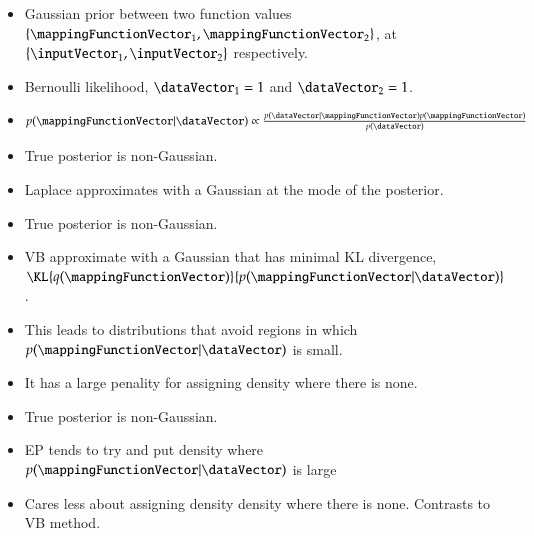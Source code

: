 \documentclass[serif, mathserif, professionalfont]{beamer} %
\newcommand{\fV}{\mappingFunctionVector}
\newcommand{\yV}{\dataVector}
\newcommand{\xV}{\inputVector}
\begin{document}
{\begin{overprint}
{        }
    \end{overprint}
    \begin{overprint}
         \begin{itemize}
            \item Gaussian prior between two function values $\{\fV_{1}, \fV_{2}\}$, at $\{\xV_{1}, \xV_{2}\}$ respectively. 
            \item Bernoulli likelihood, $\yV_{1} = 1$ and $\yV_{2} = 1$.\end{itemize}
         \begin{itemize}
            \item $p(\fV|\yV) \propto \frac{p(\yV|\fV)p(\fV)}{p(\yV)}$
            \item True posterior is non-Gaussian.
            \item Laplace approximates with a Gaussian at the mode of the posterior.
        \end{itemize}
         \begin{itemize}
            \item True posterior is non-Gaussian. 
            \item VB approximate with a Gaussian that has minimal KL divergence, $\KL{q(\fV)}{p(\fV|\yV)}$. 
            \item This leads to distributions that avoid regions in which $p(\fV|\yV)$ is small. 
            \item It has a large penality for assigning density where there is none.
        \end{itemize}
         \begin{itemize}
            \item True posterior is non-Gaussian. 
            \item EP tends to try and put density where $p(\fV|\yV)$ is large
            \item Cares less about assigning density density where there is none. Contrasts to VB method.
        \end{itemize}
    \end{overprint}
}

\end{document}
